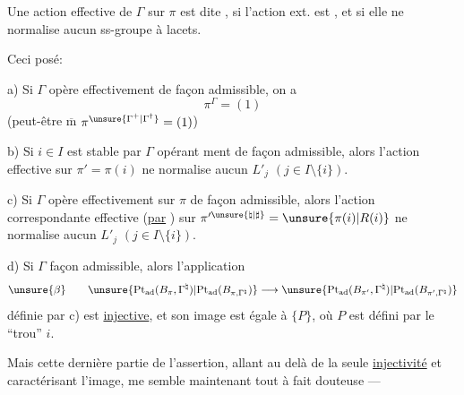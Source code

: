 Une action effective de $\Gamma$ sur $\pi$ est dite ,  si l'action ext. est , et si elle ne normalise aucun ss-groupe à lacets.

Ceci posé:

a) Si $\Gamma$ opère effectivement de façon admissible, on a
\[
\pi^\Gamma=(1)
\]
(peut-être $\overline{\mathrm m}$ $\pi^{\unsure{\Gamma^+|\Gamma^\dagger}}=(1)$) 






b) Si $i\in I$ est stable par $\Gamma$ opérant ment de façon admissible, alors l'action effective sur $\pi'=\pi(i)$ ne normalise aucun $L'_j$ $(j\in I\setminus\{i\})$.

c) Si $\Gamma$ opère effectivement sur $\pi$ de façon admissible,  alors l'action correspondante effective (\uline{par} ) sur $\pi^{\prime\unsure{\natural|\sharp}}=\unsure{\pi(i)|R(i)}$ ne normalise aucun $L'_j$ $(j\in I\setminus\{i\})$.

d) Si $\Gamma$  façon admissible, alors l'application
\[
\unsure{\beta}\qquad
\unsure{\mathrm{Pt}_{\mathrm{ad}}(B_{\pi},\Gamma^{\natural})|\mathrm{Pt}_{\mathrm{ad}}(B_{\pi,\Gamma^{\natural}})}\longrightarrow
\unsure{\mathrm{Pt}_{\mathrm{ad}}(B_{\pi'},\Gamma^{\natural})|\mathrm{Pt}_{\mathrm{ad}}(B_{\pi',\Gamma^{\natural}})}
\]
définie par c) est \uline{injective}, et  son image est  égale à $\{P\}$, où $P$ est défini par le ``trou'' $i$.

Mais cette dernière partie de l'assertion, allant au delà de la seule \uline{injectivité} et caractérisant l'image, me semble maintenant tout à fait douteuse ---

